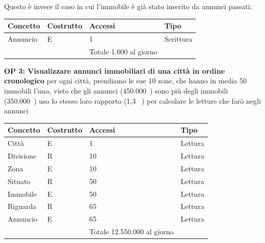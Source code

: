 \documentclass[a4paper,12pt]{report}
\begin{document}
            Questo è invece il caso in cui l'immobile è già stato inserito da annunci passati:
            
        	\begin{table}[h!]
            \centering
             \begin{tabular}{||l l l l||}
             \hline
             Concetto & Costrutto & Accessi & Tipo \\ [0.5ex] 
             \hline\hline
             Annuncio & E & 1 & Scrittura \\ 
             \hline
                &   & Totale  1.000 al giorno &  \\ [1ex] 
             \hline
             \end{tabular}
            \end{table}

            \textbf{OP 3: Visualizzare annunci immobiliari di una città in ordine cronologico}
            per ogni città, prendiamo le sue 10 zone, che hanno in media 50 immobili l'una, visto che gli annunci (450.000~) sono più degli immobili (350.000~) uso lo stesso loro rapporto (1,3 ~) per calcolare le letture che farò negli annunci
        	\begin{table}[h!]
            \centering
             \begin{tabular}{||l l l l||}
             \hline
             Concetto & Costrutto & Accessi & Tipo \\ [0.5ex] 
             \hline\hline
             Città & E & 1 & Lettura \\ 
             Divisione & R & 10 & Lettura \\ 
             Zona & E & 10 & Lettura \\ 
             Situato & R & 50 & Lettura \\ 
             Immobile & E & 50 & Lettura \\ 
             Riguarda & R & 65 & Lettura \\ 
             Annuncio & E & 65 & Lettura \\ 
             \hline
                &   & Totale  12.550.000 al giorno &  \\ [1ex] 
             \hline
             \end{tabular}
            \end{table}
\end{document}
